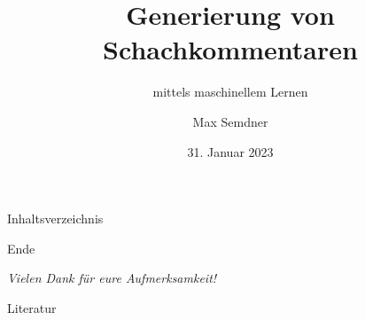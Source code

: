 \documentclass[aspectratio=169,xcolor=dvipsnames,pdf]{beamer}
\title{Generierung von Schachkommentaren}
\subtitle{mittels maschinellem Lernen}
\author{Max Semdner}
\institute{Frankfurt University of Applied Sciences}
\date{31. Januar 2023}
\begin{document}
\begin{frame}
\titlepage
\end{frame}

\begin{frame}{Inhaltsverzeichnis}
\tableofcontents
\end{frame}









\begin{frame}{Ende}
\begin{center}
\begin{large}
\textit{Vielen Dank für eure Aufmerksamkeit!}
\end{large}
\end{center}
\end{frame}

\begin{frame}[allowframebreaks]{Literatur}

\nocite{*}

\end{frame}
\end{document}
